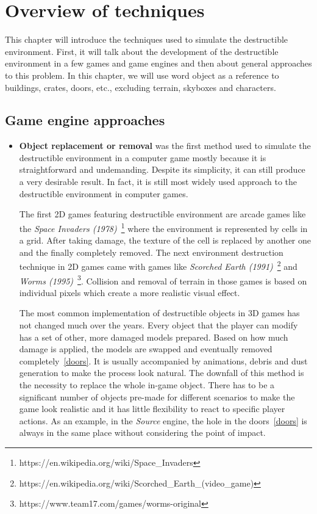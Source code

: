 \chapter{Overview of techniques}
This chapter will introduce the techniques used to simulate the destructible environment. First, it will talk about the development of the destructible environment in a few games and game engines and then about general approaches to this problem. In this chapter, we will use word object as a reference to buildings, crates, doors, etc., excluding terrain, skyboxes and characters.

\section{Game engine approaches}
\begin{itemize}
\item \textbf{Object replacement or removal} was the first method used to simulate the destructible environment in a computer game mostly because it is straightforward and undemanding. Despite its simplicity, it can still produce a very desirable result. In fact, it is still most widely used approach to the destructible environment in computer games.

The first 2D games featuring destructible environment are arcade games like the \emph{Space Invaders (1978)}~\footnote{https://en.wikipedia.org/wiki/Space\_Invaders} where the environment is represented by cells in a grid. After taking damage, the texture of the cell is replaced by another one and the finally completely removed. The next environment destruction technique in 2D games came with games like \emph{Scorched Earth (1991)}~\footnote{https://en.wikipedia.org/wiki/Scorched\_Earth\_(video\_game)} and \emph{Worms (1995)}~\footnote{https://www.team17.com/games/worms-original}. Collision and removal of terrain in those games is based on individual pixels which create a more realistic visual effect.

The most common implementation of destructible objects in 3D games has not changed much over the years. Every object that the player can modify has a set of other, more damaged models prepared. Based on how much damage is applied, the models are swapped and eventually removed completely~\ref{doors}. It is usually accompanied by animations, debris and dust generation to make the process look natural. The downfall of this method is the necessity to replace the whole in-game object. There has to be a significant number of objects pre-made for different scenarios to make the game look realistic and it has little flexibility to react to specific player actions. As an example, in the \emph{Source} engine, the hole in the doors~\ref{doors} is always in the same place without considering the point of impact.



\end{itemize}
